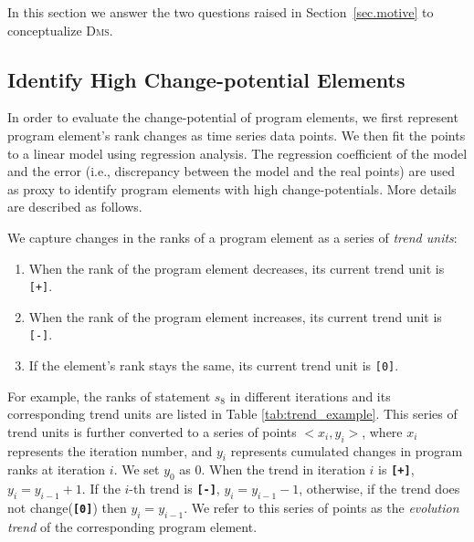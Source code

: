 

In this section we answer the two questions raised in Section~\ref{sec.motive} to conceptualize \textsc{Dms}.

\subsection{Identify High Change-potential Elements}

In order to evaluate the change-potential of program elements, we first represent program element's rank changes as time series data points. We then fit the points to a linear model using regression analysis. The regression coefficient of the model and the error (i.e., discrepancy between the model and the real points) are used as proxy to identify program elements with high change-potentials. More details are described as follows.

\vspace{0.2cm}
 We capture changes in the ranks of a program element as a series of {\em trend units}:

\begin{enumerate}
    \setlength{\itemsep}{3pt}%
	\item When the rank of the program element decreases, its current trend unit is \texttt{[+]}.
	\item When the rank of the program element increases, its current trend unit is \texttt{[-]}.
	\item If the element's rank stays the same, its current trend unit is \texttt{[0]}.
\end{enumerate}

For example, the ranks of statement $s_{8}$ in different iterations and its corresponding trend units are listed in Table \ref{tab:trend_example}. This series of trend units is further converted to a series of points $<x_{i},y_{i}>$, where $x_{i}$ represents the iteration number, and $y_{i}$ represents cumulated changes in program ranks at iteration $i$. We set $y_{0}$ as 0. When the trend in iteration $i$ is {\bf \texttt{[+]}}, $y_{i} = y_{i-1} + 1$.
If the $i$-th trend is {\bf \texttt{[-]}}, $y_{i} = y_{i-1} - 1$, otherwise, if the trend does not change({\bf \texttt{[0]}}) then $y_{i} = y_{i-1}$. We refer to this series of points as the {\em evolution trend} of the corresponding program element.

